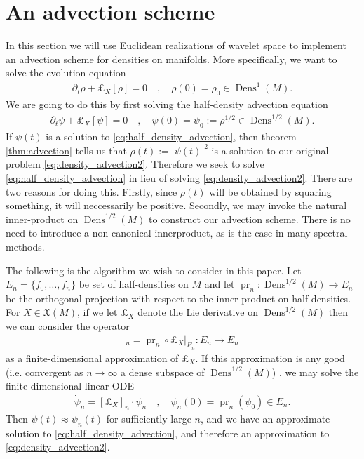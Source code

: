 \documentclass[letterpaper, 12 pt]{amsart}
\DeclareMathOperator{\Dens}{Dens}
\DeclareMathOperator{\pr}{pr}
\begin{document}


\section{An advection scheme}
\label{sec:scheme}
   In this section we will use Euclidean realizations of wavelet space
   to implement an advection scheme for densities on manifolds.
   More specifically, we want to solve the evolution equation
   \begin{align}
     \partial_t \rho + \pounds_X[\rho] = 0 \quad , \quad 
     \rho(0) = \rho_0 \in \Dens^1(M). \label{eq:density_advection2}
   \end{align}
   We are going to do this by first solving the half-density advection
   equation
   \begin{align}
     \partial_t \psi + \pounds_X[\psi] = 0 \quad , \quad
     \psi(0) = \psi_0 := \rho^{1/2} \in \Dens^{1/2}(M). \label{eq:half_density_advection}
   \end{align}
   If $\psi(t)$ is a solution to \eqref{eq:half_density_advection}, then theorem \ref{thm:advection} tells us that $\rho(t) := |\psi(t)|^2$
   is a solution to our original problem \eqref{eq:density_advection2}.
   Therefore we seek to solve \eqref{eq:half_density_advection}
   in lieu of solving \eqref{eq:density_advection2}.
   There are two reasons for doing this.
   Firstly, since $\rho(t)$ will be obtained by squaring something,
   it will neccessarily be positive.
   Secondly, we may invoke the natural inner-product on $\Dens^{1/2}(M)$
   to construct our advection scheme.
   There is no need to introduce a non-canonical innerproduct, as is
   the case in many spectral methods.
   
   The following is the algorithm we wish to consider in this paper.
   Let $E_n = \{ f_0, \dots, f_n \}$ be set of half-densities on $M$
   and let $\pr_n : \Dens^{1/2}(M) \to E_n$ be the orthogonal projection
   with respect to the inner-product on half-densities.
   For $X \in \mathfrak{X}(M)$, if we let $\pounds_X$ denote the Lie 
   derivative on $\Dens^{1/2}(M)$ then we can consider the operator
   \begin{align*}
     [\pounds_X]_n = \pr_n \circ \left. \pounds_X \right|_{E_n} : 
     E_n \to E_n
   \end{align*}
   as a finite-dimensional approximation of $\pounds_X$.
   If this approximation is any good
   (i.e. convergent as $n \to \infty$ a dense subspace of $\Dens^{1/2}(M)$)
   , we may solve the finite dimensional
   linear ODE
   \begin{align*}
     \dot{\psi}_n = [\pounds_X]_n \cdot \psi_n \quad , \quad
     \psi_n(0) = \pr_n( \psi_0 ) \in E_n.
   \end{align*}
   Then $\psi(t) \approx \psi_n(t)$ for sufficiently large $n$,
   and we have an approximate solution to \eqref{eq:half_density_advection},
   and therefore an approximation to \eqref{eq:density_advection2}.
\end{document}

